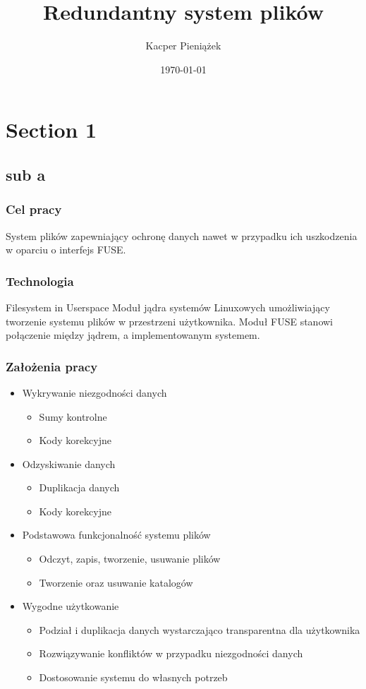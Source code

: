 \documentclass{beamer}
\title{Redundantny system plików}
\author{Kacper Pieniążek}
\date{\today}
\begin{document}
	\begin{frame}
		\titlepage
	\end{frame}

	\section{Section 1}
	\subsection{sub a}
	
	\begin{frame}
		\frametitle{Cel pracy}
			System plików zapewniający ochronę danych nawet w przypadku ich uszkodzenia w oparciu o interfejs FUSE.
	\end{frame}
	
	\begin{frame}
		\frametitle{Technologia}
            \begin{block}{Filesystem in Userspace}
			    Moduł jądra systemów Linuxowych umożliwiający tworzenie systemu plików w przestrzeni użytkownika. Moduł FUSE stanowi połączenie między jądrem, a implementowanym systemem.
            \end{block}
	\end{frame}


	\begin{frame}
		\frametitle{Założenia pracy}
		\begin{itemize}
			\item Wykrywanie niezgodności danych
				\begin{itemize}
					\item Sumy kontrolne
					\item Kody korekcyjne
				\end{itemize}
			\pause
			\item Odzyskiwanie danych
			\begin{itemize}
				\item Duplikacja danych
				\item Kody korekcyjne
			\end{itemize}
			\pause
			\item Podstawowa funkcjonalność systemu plików
			\begin{itemize}
				\item Odczyt, zapis, tworzenie, usuwanie plików
                \item Tworzenie oraz usuwanie katalogów
			\end{itemize}
			\pause
			\item Wygodne użytkowanie
			\begin{itemize}
				\item Podział i duplikacja danych wystarczająco transparentna dla użytkownika
				\item Rozwiązywanie konfliktów w przypadku niezgodności danych
				\item Dostosowanie systemu do własnych potrzeb
			\end{itemize}
		\end{itemize}
	\end{frame}
	
\end{document}
